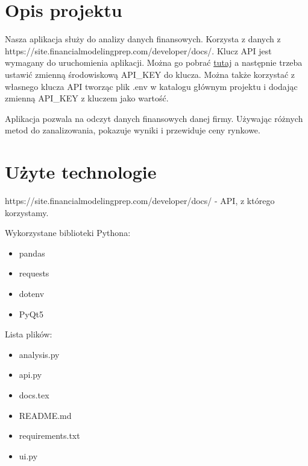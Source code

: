 \documentclass[12pt]{article}
\begin{document}
	\maketitle
	
	\section{Opis projektu}\label{sec:opis-projektu}
	Nasza aplikacja służy do analizy danych finansowych.
	Korzysta z danych z https://site.financialmodelingprep.com/developer/docs/.
	Klucz API jest wymagany do uruchomienia aplikacji.
	Można go pobrać \href{https://site.financialmodelingprep.com/login}{tutaj} a następnie
	trzeba ustawić zmienną środowiskową API\_KEY do klucza.
	Można także korzystać z własnego klucza API tworząc plik .env w katalogu głównym projektu i
	dodając zmienną API\_KEY z kluczem jako wartość.

	Aplikacja pozwala na odczyt danych finansowych danej firmy.
	Używając różnych metod do zanalizowania, pokazuje wyniki i przewiduje ceny rynkowe.

	\section{Użyte technologie}\label{sec:uzyte-echnologie}
	 https://site.financialmodelingprep.com/developer/docs/ - API, z którego korzystamy.

	 Wykorzystane biblioteki Pythona:
	\begin{itemize}
		\item pandas
		\item requests
		\item dotenv
		\item PyQt5
	\end{itemize}

	Lista plików:
	\begin{itemize}
		\item analysis.py
		\item api.py
		\item docs.tex
		\item README.md
		\item requirements.txt
		\item ui.py
	\end{itemize}
\end{document}

